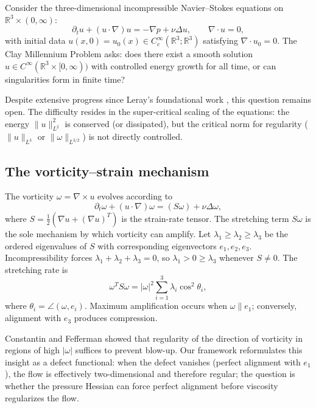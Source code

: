 \documentclass[11pt]{article}
\theoremstyle{definition}
\theoremstyle{remark}
\newcommand{\R}{\mathbb{R}}
\begin{document}
Consider the three-dimensional incompressible Navier--Stokes equations on
$\R^3 \times (0,\infty)$:
\begin{equation}\label{eq:NS}
  \partial_t u + (u \cdot \nabla) u = -\nabla p + \nu \Delta u, \qquad
  \nabla \cdot u = 0,
\end{equation}
with initial data $u(x,0) = u_0(x) \in C_c^\infty(\R^3; \R^3)$ satisfying
$\nabla \cdot u_0 = 0$.  The Clay Millennium Problem asks: does there exist a
smooth solution $u \in C^\infty(\R^3 \times [0,\infty))$ with controlled energy
growth for all time, or can singularities form in finite time?

Despite extensive progress since Leray's foundational work \cite{Leray}, this
question remains open.  The difficulty resides in the super-critical scaling of the
equations: the energy $\|u\|_{L^2}^2$ is conserved (or dissipated), but the
critical norm for regularity ($\|u\|_{L^3}$ or $\|\omega\|_{L^{3/2}}$) is not
directly controlled.

\subsection{The vorticity--strain mechanism}

The vorticity $\omega = \nabla \times u$ evolves according to
\begin{equation}\label{eq:vorticity}
  \partial_t \omega + (u\cdot\nabla)\omega = (S\omega) + \nu\Delta\omega,
\end{equation}
where $S = \tfrac{1}{2}(\nabla u + (\nabla u)^T)$ is the strain-rate tensor.  The
stretching term $S\omega$ is the sole mechanism by which vorticity can amplify.
Let $\lambda_1 \geq \lambda_2 \geq \lambda_3$ be the ordered eigenvalues of $S$
with corresponding eigenvectors $e_1, e_2, e_3$.  Incompressibility forces
$\lambda_1 + \lambda_2 + \lambda_3 = 0$, so $\lambda_1 > 0 \geq \lambda_3$ whenever
$S \neq 0$.  The stretching rate is
\[
  \omega^T S\omega = |\omega|^2 \sum_{i=1}^3 \lambda_i \cos^2\theta_i,
\]
where $\theta_i = \angle(\omega, e_i)$.  Maximum amplification occurs when
$\omega \| e_1$; conversely, alignment with $e_3$ produces compression.

Constantin and Fefferman \cite{CF} showed that regularity of the direction of
vorticity in regions of high $|\omega|$ suffices to prevent blow-up.  Our framework
reformulates this insight as a defect functional: when the defect vanishes
(perfect alignment with $e_1$), the flow is effectively two-dimensional and therefore
regular; the question is whether the pressure Hessian can force perfect alignment
before viscosity regularizes the flow.
\end{document}
